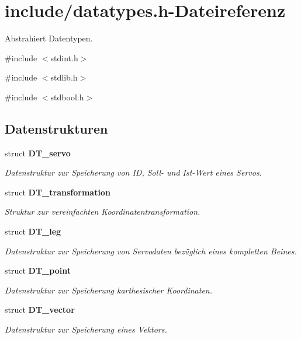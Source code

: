 \section{include/datatypes.h-\/Dateireferenz}
\label{datatypes_8h}


Abstrahiert Datentypen.  


{\ttfamily \#include $<$stdint.h$>$}\par
{\ttfamily \#include $<$stdlib.h$>$}\par
{\ttfamily \#include $<$stdbool.h$>$}\par
\subsection*{Datenstrukturen}
\begin{DoxyCompactItemize}
\item 
struct {\bf DT\_\-servo}
\begin{DoxyCompactList}\small\item\em Datenstruktur zur Speicherung von ID, Soll-\/ und Ist-\/Wert eines Servos. \item\end{DoxyCompactList}\item 
struct {\bf DT\_\-transformation}
\begin{DoxyCompactList}\small\item\em Struktur zur vereinfachten Koordinatentransformation. \item\end{DoxyCompactList}\item 
struct {\bf DT\_\-leg}
\begin{DoxyCompactList}\small\item\em Datenstruktur zur Speicherung von Servodaten bezüglich eines kompletten Beines. \item\end{DoxyCompactList}\item 
struct {\bf DT\_\-point}
\begin{DoxyCompactList}\small\item\em Datenstruktur zur Speicherung karthesischer Koordinaten. \item\end{DoxyCompactList}\item 
struct {\bf DT\_\-vector}
\begin{DoxyCompactList}\small\item\em Datenstruktur zur Speicherung eines Vektors. \item\end{DoxyCompactList}\item 

\end{DoxyCompactItemize}
